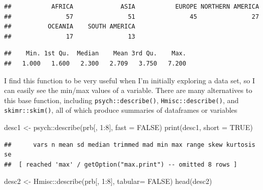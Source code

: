 \documentclass[
]{article}
\newenvironment{Shaded}{\begin{snugshade}}{\end{snugshade}}
\newcommand{\AttributeTok}[1]{\textcolor[rgb]{0.77,0.63,0.00}{#1}}
\newcommand{\ConstantTok}[1]{\textcolor[rgb]{0.00,0.00,0.00}{#1}}
\newcommand{\DecValTok}[1]{\textcolor[rgb]{0.00,0.00,0.81}{#1}}
\newcommand{\FunctionTok}[1]{\textcolor[rgb]{0.00,0.00,0.00}{#1}}
\newcommand{\NormalTok}[1]{#1}
\newcommand{\OtherTok}[1]{\textcolor[rgb]{0.56,0.35,0.01}{#1}}
\newcommand{\SpecialCharTok}[1]{\textcolor[rgb]{0.00,0.00,0.00}{#1}}
\begin{document}
\begin{verbatim}
##           AFRICA             ASIA           EUROPE NORTHERN AMERICA 
##               57               51               45               27 
##          OCEANIA    SOUTH AMERICA 
##               17               13
\end{verbatim}

\begin{Shaded}
\end{Shaded}

\begin{verbatim}
##    Min. 1st Qu.  Median    Mean 3rd Qu.    Max. 
##   1.000   1.600   2.300   2.709   3.750   7.200
\end{verbatim}

I find this function to be very useful when I'm initially exploring a
data set, so I can easily see the min/max values of a variable. There
are many alternatives to this base function, including
\texttt{psych::describe()}, \texttt{Hmisc::describe()}, and \texttt{skimr::skim()}, all of
which produce summaries of dataframes or variables

\begin{Shaded}
\begin{Highlighting}[]
\NormalTok{desc1  }\OtherTok{\textless{}{-}}\NormalTok{  psych}\SpecialCharTok{::}\FunctionTok{describe}\NormalTok{(prb[, }\DecValTok{1}\SpecialCharTok{:}\DecValTok{8}\NormalTok{],}
                           \AttributeTok{fast =} \ConstantTok{FALSE}\NormalTok{)}
\FunctionTok{print}\NormalTok{(desc1,}
      \AttributeTok{short =} \ConstantTok{TRUE}\NormalTok{)}
\end{Highlighting}
\end{Shaded}

\begin{verbatim}
##      vars n mean sd median trimmed mad min max range skew kurtosis se
##  [ reached 'max' / getOption("max.print") -- omitted 8 rows ]
\end{verbatim}

\begin{Shaded}
\begin{Highlighting}[]
\NormalTok{desc2 }\OtherTok{\textless{}{-}}\NormalTok{  Hmisc}\SpecialCharTok{::}\FunctionTok{describe}\NormalTok{(prb[, }\DecValTok{1}\SpecialCharTok{:}\DecValTok{8}\NormalTok{],}
                          \AttributeTok{tabular=} \ConstantTok{FALSE}\NormalTok{)}
\FunctionTok{head}\NormalTok{(desc2)}
\end{Highlighting}
\end{Shaded}
\end{document}
